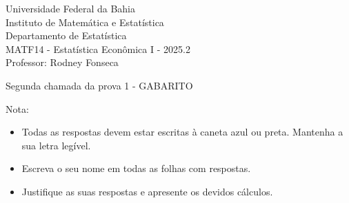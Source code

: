 \documentclass{article}
\date{--/--/----} %
\begin{document}
\begin{flushleft}
	Universidade Federal da Bahia\\
	Instituto de Matemática e Estatística\\
	Departamento de Estatística\\
	MATF14 - Estatística Econômica I - 2025.2\\
	Professor: Rodney Fonseca \\
\end{flushleft}

\begin{center}
	\begin{Large}
		Segunda chamada da prova 1 {\color{blue} - GABARITO} \\
	\end{Large}	
\end{center}

\hspace{2em} Nota: 

\vspace{1em}

\begin{flushleft}
\begin{small}

\begin{itemize}
	\item Todas as respostas devem estar escritas à caneta azul ou preta. Mantenha a sua letra legível.
	\item Escreva o seu nome em todas as folhas com respostas.
	\item Justifique as suas respostas e apresente os devidos cálculos.
\end{itemize}

\end{small}
\end{flushleft}

\vspace{1em}

\end{document}
